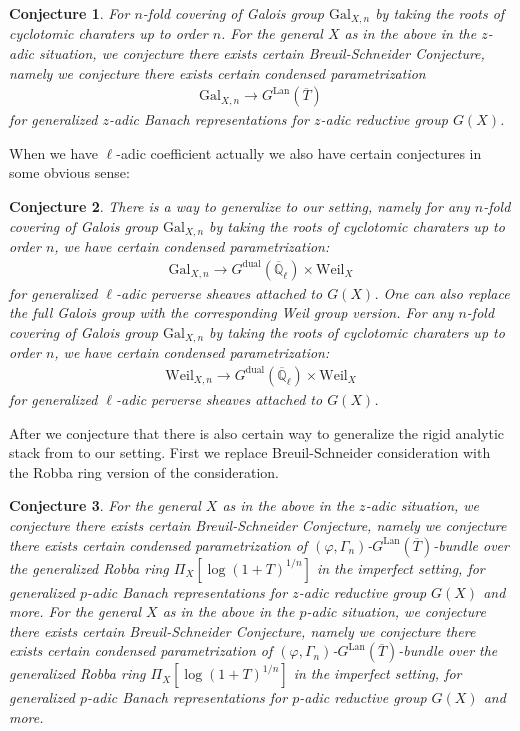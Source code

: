 \documentclass[12pt]{article}
\newtheorem{conjecture}{Conjecture}
\theoremstyle{definition}
\begin{document}
\begin{conjecture}
For $n$-fold covering of Galois group $\mathrm{Gal}_{X,n}$ by taking the roots of cyclotomic charaters up to order $n$. For the general $X$ as in the above in the $z$-adic situation, we conjecture there exists certain \textit{Breuil-Schneider Conjecture}, namely we conjecture there exists certain condensed parametrization 
\begin{align}
\mathrm{Gal}_{X,n} \rightarrow G^\mathrm{Lan}(\overline{T})
\end{align}
for generalized $z$-adic Banach representations for $z$-adic reductive group $G(X)$.
\end{conjecture}

\indent When we have $\ell$-adic coefficient actually we also have certain conjectures in some obvious sense:

\begin{conjecture}
There is a way to generalize \cite{FS} to our setting, namely for any $n$-fold covering of Galois group $\mathrm{Gal}_{X,n}$ by taking the roots of cyclotomic charaters up to order $n$, we have certain condensed parametrization:
\begin{align}
\mathrm{Gal}_{X,n} \rightarrow G^\mathrm{dual}(\overline{\mathbb{Q}}_\ell)\times \mathrm{Weil}_X
\end{align}
for generalized $\ell$-adic perverse sheaves attached to $G(X)$. One can also replace the full Galois group with the corresponding Weil group version. For any $n$-fold covering of Galois group $\mathrm{Gal}_{X,n}$ by taking the roots of cyclotomic charaters up to order $n$, we have certain condensed parametrization:
\begin{align}
\mathrm{Weil}_{X,n} \rightarrow G^\mathrm{dual}(\overline{\mathbb{Q}}_\ell)\times \mathrm{Weil}_X
\end{align}
for generalized $\ell$-adic perverse sheaves attached to $G(X)$. 
\end{conjecture}

\noindent After \cite{EGH} we conjecture that there is also certain way to generalize the rigid analytic stack from \cite{EGH} to our setting. First we replace Breuil-Schneider consideration with the Robba ring version of the consideration. 

\begin{conjecture}
For the general $X$ as in the above in the $z$-adic situation, we conjecture there exists certain \textit{Breuil-Schneider Conjecture}, namely we conjecture there exists certain condensed parametrization of $(\varphi,\Gamma_n)$-$G^\mathrm{Lan}(\overline{T})$-bundle over the generalized Robba ring $\Pi_X[\log(1+T)^{1/n}]$ in the imperfect setting, for generalized $p$-adic Banach representations for $z$-adic reductive group $G(X)$ and more. For the general $X$ as in the above in the $p$-adic situation, we conjecture there exists certain \textit{Breuil-Schneider Conjecture}, namely we conjecture there exists certain condensed parametrization of $(\varphi,\Gamma_n)$-$G^\mathrm{Lan}(\overline{T})$-bundle over the generalized Robba ring $\Pi_X[\log(1+T)^{1/n}]$ in the imperfect setting, for generalized $p$-adic Banach representations for $p$-adic reductive group $G(X)$ and more.
\end{conjecture}
\end{document}
